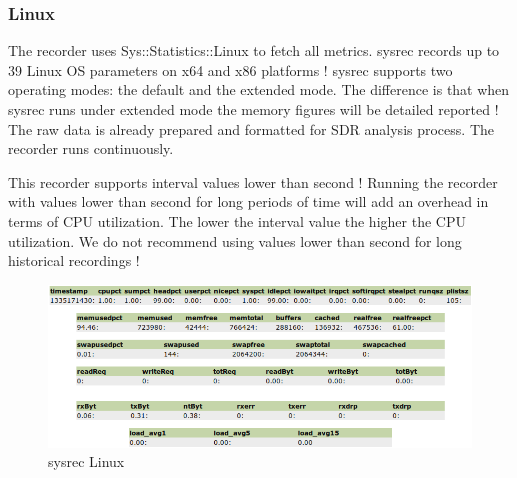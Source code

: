 \subsubsection{Linux}


The recorder uses Sys::Statistics::Linux to fetch all metrics. sysrec records 
up to 39 Linux OS parameters on x64 and x86 platforms ! sysrec supports two
operating modes: the default and the extended mode. The difference is that 
when sysrec runs under extended mode the memory figures will be detailed 
reported ! The raw data is already prepared and formatted for SDR analysis 
process. The recorder runs continuously.

This recorder supports interval values lower than second ! Running the
recorder with values lower than second for long periods of
time will add an overhead in terms of CPU utilization. The lower
the interval value the higher the CPU utilization. We do not
recommend using values lower than second for long historical recordings !

\begin{figure}[!ht]
\centering
\includegraphics[scale=0.62]{sysrec_linux.png}
\caption{sysrec Linux}
\label{fig:sysrec.linux}
\end{figure}


